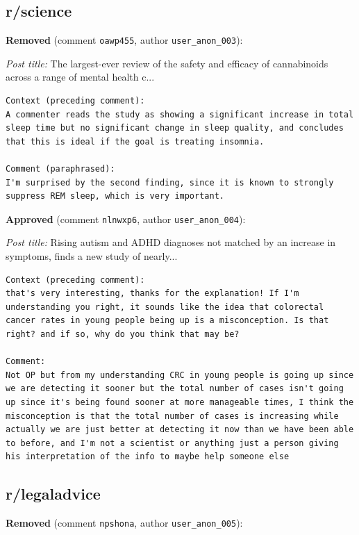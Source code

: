 \subsection*{r/science}

\noindent\textbf{Removed} (comment \texttt{oawp455}, author \texttt{user\_anon\_003}):

\noindent\emph{Post title:} The largest-ever review of the safety and efficacy of cannabinoids across a range of mental health c...

\begin{lstlisting}
Context (preceding comment):
A commenter reads the study as showing a significant increase in total sleep time but no significant change in sleep quality, and concludes that this is ideal if the goal is treating insomnia.

Comment (paraphrased):
I'm surprised by the second finding, since it is known to strongly suppress REM sleep, which is very important.
\end{lstlisting}

\noindent\textbf{Approved} (comment \texttt{nlnwxp6}, author \texttt{user\_anon\_004}):

\noindent\emph{Post title:} Rising autism and ADHD diagnoses not matched by an increase in symptoms, finds a new study of nearly...

\begin{lstlisting}
Context (preceding comment):
that's very interesting, thanks for the explanation! If I'm understanding you right, it sounds like the idea that colorectal cancer rates in young people being up is a misconception. Is that right? and if so, why do you think that may be?

Comment:
Not OP but from my understanding CRC in young people is going up since we are detecting it sooner but the total number of cases isn't going up since it's being found sooner at more manageable times, I think the misconception is that the total number of cases is increasing while actually we are just better at detecting it now than we have been able to before, and I'm not a scientist or anything just a person giving his interpretation of the info to maybe help someone else
\end{lstlisting}


\subsection*{r/legaladvice}

\noindent\textbf{Removed} (comment \texttt{npshona}, author \texttt{user\_anon\_005}):

